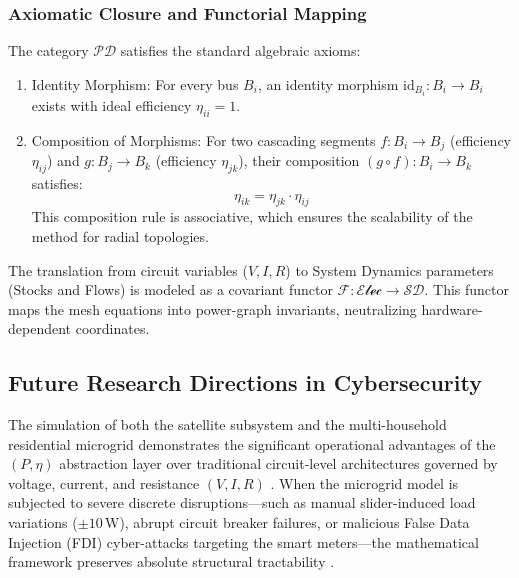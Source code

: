\documentclass[energies,accept,oneauthor,pdftex]{Definitions/mdpi}
\begin{document}
\subsubsection*{Axiomatic Closure and Functorial Mapping}
The category $\mathcal{PD}$ satisfies the standard algebraic axioms:
\begin{enumerate}
    \item {Identity Morphism:} For every bus $B_i$, an identity morphism $\mathrm{id}_{B_i}: B_i \to B_i$ exists with ideal efficiency $\eta_{ii} = 1$.
    \item {Composition of Morphisms:} For two cascading segments $f: B_i \to B_j$ (efficiency $\eta_{ij}$) and $g: B_j \to B_k$ (efficiency $\eta_{jk}$), their composition $(g \circ f): B_i \to B_k$ satisfies:
    \begin{equation}
        \eta_{ik} = \eta_{jk} \cdot \eta_{ij}
    \end{equation}
    This composition rule is associative, which ensures the scalability of the method for radial topologies.
\end{enumerate}

The translation from circuit variables ($V, I, R$) to System Dynamics parameters (Stocks and Flows) is modeled as a covariant functor $\mathscr{F}: \mathscr{Elec} \to \mathcal{SD}$. This functor maps the mesh equations into power-graph invariants, neutralizing hardware-dependent coordinates.



\subsection{Future Research Directions in Cybersecurity}
The simulation of both the satellite subsystem and the multi-household residential microgrid demonstrates the significant operational advantages of the $(P, \eta)$ abstraction layer over traditional circuit-level architectures governed by voltage, current, and resistance $(V, I, R)$ \cite{alsbua2026artificial}. When the microgrid model is subjected to severe discrete disruptions—such as manual slider-induced load variations ($\pm 10\,\text{W}$), abrupt circuit breaker failures, or malicious False Data Injection (FDI) cyber-attacks targeting the smart meters—the mathematical framework preserves absolute structural tractability \cite{mu2026data}.
\end{document}
